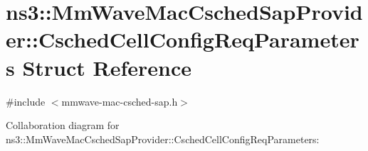 \hypertarget{structns3_1_1MmWaveMacCschedSapProvider_1_1CschedCellConfigReqParameters}{}\section{ns3\+:\+:Mm\+Wave\+Mac\+Csched\+Sap\+Provider\+:\+:Csched\+Cell\+Config\+Req\+Parameters Struct Reference}
\label{structns3_1_1MmWaveMacCschedSapProvider_1_1CschedCellConfigReqParameters}


{\ttfamily \#include $<$mmwave-\/mac-\/csched-\/sap.\+h$>$}



Collaboration diagram for ns3\+:\+:Mm\+Wave\+Mac\+Csched\+Sap\+Provider\+:\+:Csched\+Cell\+Config\+Req\+Parameters\+:
